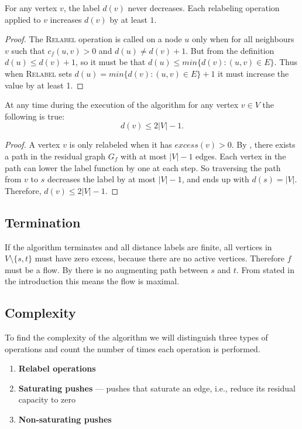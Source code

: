 \begin{lemma}\label{lem:dist}
 For any vertex $v$, the label $d(v)$ never decreases. Each relabeling operation applied to $v$ increases $d(v)$ by at least $1$.
\end{lemma}

\begin{proof}
The \textsc{Relabel} operation is called on a node $u$ only when for all neighbours $v$ such that $c_f(u,v) >0$ and $d(u) \neq d(v) + 1$. But from the definition $d(u) \leq d(v) + 1$, so it must be that $d(u) \leq min\{d(v) \colon (u,v) \in E \}$. Thus when \textsc{Relabel} sets $d(u) = min\{d(v) \colon (u,v) \in E \} + 1$ it must increase the value by at least 1.
\end{proof}


\begin{lemma}\label{lem:dist2}
 At any time during the execution of the algorithm for any
vertex $v \in V$ the following is true:
$$
d(v) \leq 2|V|-1.
$$
\end{lemma}

\begin{proof}
A vertex $v$ is only relabeled when it has $excess(v) > 0$. By , there exists a path in the residual graph $G_f$ with at most $|V| - 1$ edges. Each vertex in the path can lower the label function by one at each step. So traversing the path from $v$ to $s$ decreases the label by at most $|V| - 1$, and ends up with $d(s) = |V|$. Therefore, $d(v) \leq 2|V| - 1$.
\end{proof}

\subsection*{Termination}
 If the algorithm terminates and all distance labels are finite, all vertices
in $V \setminus \{s, t\}$ must have zero excess, because there are no active vertices. Therefore
$f$ must be a flow. By  there is no augmenting path between $s$ and $t$. From  stated in the introduction this means the flow is maximal.

\subsection*{Complexity}
To find the complexity of the algorithm we will distinguish three types of operations and count the number of times each operation is performed.
\begin{enumerate}
    \item \textbf{Relabel operations}
    \item \textbf{Saturating pushes} — pushes that saturate an edge, i.e., reduce its residual capacity to zero
    \item \textbf{Non-saturating pushes}
\end{enumerate}


